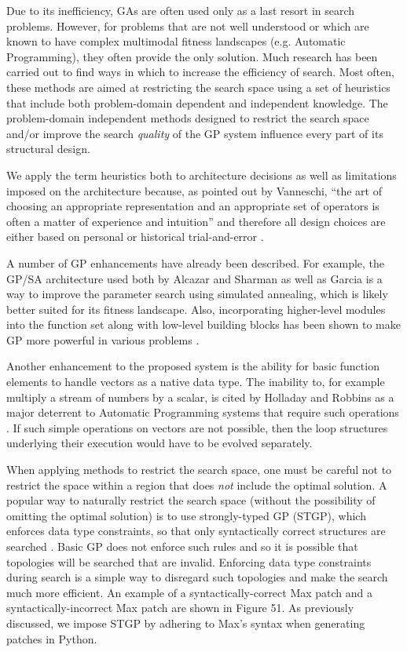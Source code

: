 \documentclass[12pt]{report} 	%
\numberwithin{figure}{chapter}
\numberwithin{table}{chapter}
\numberwithin{equation}{chapter}
\begin{document}
\begin{flushleft}
Due to its inefficiency, GAs are often used only as a last resort in search problems. However, for problems that are not well understood or which are known to have complex multimodal fitness landscapes (e.g. Automatic Programming), they often provide the only solution. Much research has been carried out to find ways in which to increase the efficiency of search. Most often, these methods are aimed at restricting the search space using a set of heuristics that include both problem-domain dependent and independent knowledge. The problem-domain independent methods designed to restrict the search space and/or improve the search \textit{quality} of the GP system influence every part of its structural design. 

We apply the term heuristics both to architecture decisions as well as limitations imposed on the architecture because, as pointed out by Vanneschi, ``the art of choosing an appropriate representation and an appropriate set of operators is often a matter of experience and intuition'' and therefore all design choices are either based on personal or historical trial-and-error \cite[p. 6]{Vanneschi:2004le}.

A number of GP enhancements have already been described. For example, the GP/SA architecture used both by Alcazar and Sharman \cite{Alcazar:1996la} as well as Garcia \cite{Garcia:2002cq} is a way to improve the parameter search using simulated annealing, which is likely better suited for its fitness landscape. Also, incorporating higher-level modules into the function set along with low-level building blocks has been shown to make GP more powerful in various problems \cite{Koza:1997zr}. 

Another enhancement to the proposed system is the ability for basic function elements to handle vectors as a native data type. The inability to, for example multiply a stream of numbers by a scalar, is cited by Holladay and Robbins as a major deterrent to Automatic Programming systems that require such operations \cite[p. 1]{Holladay:2007ct}. If such simple operations on vectors are not possible, then the loop structures underlying their execution would have to be evolved separately.

When applying methods to restrict the search space, one must be careful not to restrict the space within a region that does \textit{not} include the optimal solution. A popular way to naturally restrict the search space (without the possibility of omitting the optimal solution) is to use strongly-typed GP (STGP), which enforces data type constraints, so that only syntactically correct structures are searched  \cite{Vanneschi:2004le, Harris:1997qf, Pachet:2007if}. Basic GP does not enforce such rules and so it is possible that topologies will be searched that are invalid. Enforcing data type constraints during search is a simple way to disregard such topologies and make the search much more efficient. An example of a syntactically-correct Max patch and a syntactically-incorrect Max patch are shown in Figure 51. As previously discussed, we impose STGP by adhering to Max's syntax when generating patches in Python.


\end{flushleft}
\end{document}
